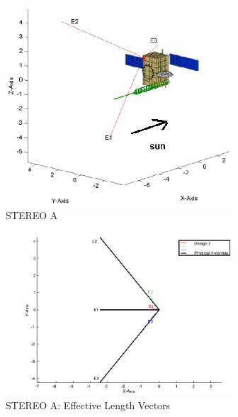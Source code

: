 \documentclass[galley,ras]{agu2001}
\begin{document}
\begin{article}
\begin{figure}
\noindent\includegraphics[width=20pc]{SpaceCraftD2HGA0Oblique.eps}
\caption{STEREO A}\label{fig_D2_A_Oblique}
 \end{figure}


 \begin{figure}
 \noindent \includegraphics[width=20pc]{HeffD2HGA0-500kHz-ZViewCap.eps}
 \caption{STEREO A: Effective Length Vectors}\label{fig_Heff_D2_A_Z_ViewCap}
 \end{figure}



\end{article}
\end{document}
